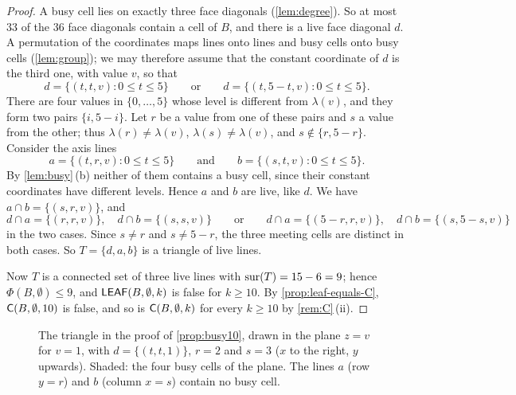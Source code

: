 \begin{proof}
A busy cell lies on exactly three face diagonals (\cref{lem:degree}). So at most $33$ of the $36$ face
diagonals contain a cell of $B$, and there is a live face diagonal $d$. A permutation of the coordinates
maps lines onto lines and busy cells onto busy cells (\cref{lem:group}); we may therefore assume that the
constant coordinate of $d$ is the third one, with value $v$, so that
\[
  d=\{(t,t,v):0\le t\le 5\}\qquad\text{or}\qquad d=\{(t,5-t,v):0\le t\le 5\}.
\]
There are four values in $\{0,\dots,5\}$ whose level is different from $\lambda(v)$, and they form two
pairs $\{i,5-i\}$. Let $r$ be a value from one of these pairs and $s$ a value from the other; thus
$\lambda(r)\ne\lambda(v)$, $\lambda(s)\ne\lambda(v)$, and $s\notin\{r,5-r\}$. Consider the axis lines
\[
  a=\{(t,r,v):0\le t\le 5\}\qquad\text{and}\qquad b=\{(s,t,v):0\le t\le 5\}.
\]
By \cref{lem:busy}\,(b) neither of them contains a busy cell, since their constant coordinates have
different levels. Hence $a$ and $b$ are live, like $d$. We have $a\cap b=\{(s,r,v)\}$, and
\[
  d\cap a=\{(r,r,v)\},\quad d\cap b=\{(s,s,v)\}\qquad\text{or}\qquad
  d\cap a=\{(5-r,r,v)\},\quad d\cap b=\{(s,5-s,v)\}
\]
in the two cases. Since $s\ne r$ and $s\ne 5-r$, the three meeting cells are distinct in both cases. So
$T=\{d,a,b\}$ is a triangle of live lines.

Now $T$ is a connected set of three live lines with $\operatorname{sur}(T)=15-6=9$; hence $\Phi(B,\emptyset)\le 9$, and
$\mathsf{LEAF}(B,\emptyset,k)$ is false for $k\ge 10$. By \cref{prop:leaf-equals-C}, $\mathsf{C}(B,\emptyset,10)$ is false,
and so is $\mathsf{C}(B,\emptyset,k)$ for every $k\ge 10$ by \cref{rem:C}\,(ii).
\end{proof}

\begin{figure}[t]
\centering
{}
\caption{The triangle in the proof of \cref{prop:busy10}, drawn in the plane $z=v$ for $v=1$, with
$d=\{(t,t,1)\}$, $r=2$ and $s=3$ ($x$ to the right, $y$ upwards). Shaded: the four busy cells of the
plane. The lines $a$ (row $y=r$) and $b$ (column $x=s$) contain no busy cell.}
\label{fig:triangle}
\end{figure}

